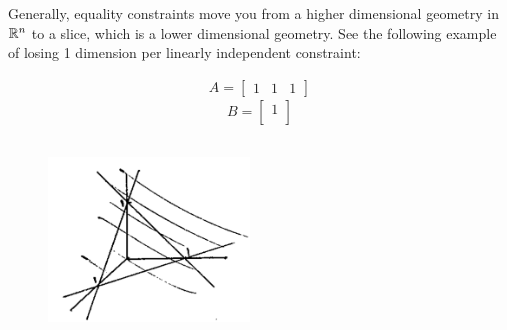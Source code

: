 \begin{example}
	Generally, equality constraints move you from a higher dimensional geometry in $\mathbb{R}^n$ to a slice, which is a lower dimensional geometry. See the following example of losing 1 dimension per linearly independent constraint:
	
	
	\begin{align*}
		A =
		\begin{bmatrix}
			1&1&1
		\end{bmatrix}
	\end{align*}
	\begin{equation*}
		B= 
		\begin{bmatrix}
			1\\
		\end{bmatrix}
	\end{equation*}
	
	\begin{figure}
		\centering
		\includegraphics[width=2.1in,height=2.1in]{figures/ch07/figure1012_3.png}
	\end{figure}
\end{example}

